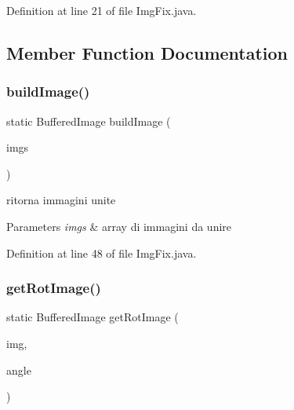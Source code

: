 Definition at line 21 of file Img\+Fix.\+java.



\subsection{Member Function Documentation}
\mbox{\label{classhelpz_1_1_img_fix_a1dabaa5ea503e0530b951a21811df80e}} 
\subsubsection{\texorpdfstring{build\+Image()}{buildImage()}}
{\footnotesize\ttfamily static Buffered\+Image build\+Image (\begin{DoxyParamCaption}\item[{Buffered\+Image \mbox{[}$\,$\mbox{]}}]{imgs }\end{DoxyParamCaption})\hspace{0.3cm}{\ttfamily [static]}}



ritorna immagini unite 


\begin{DoxyParams}{Parameters}
{\em imgs} & array di immagini da unire \\
\hline
\end{DoxyParams}


Definition at line 48 of file Img\+Fix.\+java.

\mbox{\label{classhelpz_1_1_img_fix_aa29daa5edc91f3950ba54a6b2018a48b}} 
\subsubsection{\texorpdfstring{get\+Rot\+Image()}{getRotImage()}}
{\footnotesize\ttfamily static Buffered\+Image get\+Rot\+Image (\begin{DoxyParamCaption}\item[{Buffered\+Image}]{img,  }\item[{int}]{angle }\end{DoxyParamCaption})\hspace{0.3cm}{\ttfamily [static]}}



